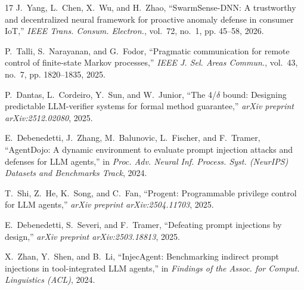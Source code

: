 \documentclass[conference]{IEEEtran}
\begin{document}
\begin{thebibliography}{17}
J.~Yang, L.~Chen, X.~Wu, and H.~Zhao, ``SwarmSense-DNN: A trustworthy and decentralized neural framework for proactive anomaly defense in consumer IoT,'' \emph{IEEE Trans. Consum. Electron.}, vol.~72, no.~1, pp. 45--58, 2026.

P.~Talli, S.~Narayanan, and G.~Fodor, ``Pragmatic communication for remote control of finite-state Markov processes,'' \emph{IEEE J. Sel. Areas Commun.}, vol.~43, no.~7, pp. 1820--1835, 2025.

P.~Dantas, L.~Cordeiro, Y.~Sun, and W.~Junior, ``The 4/$\delta$ bound: Designing predictable LLM-verifier systems for formal method guarantee,'' \emph{arXiv preprint arXiv:2512.02080}, 2025.

E.~Debenedetti, J.~Zhang, M.~Balunovic, L.~Fischer, and F.~Tramer, ``AgentDojo: A dynamic environment to evaluate prompt injection attacks and defenses for LLM agents,'' in \emph{Proc. Adv. Neural Inf. Process. Syst. (NeurIPS) Datasets and Benchmarks Track}, 2024.

T.~Shi, Z.~He, K.~Song, and C.~Fan, ``Progent: Programmable privilege control for LLM agents,'' \emph{arXiv preprint arXiv:2504.11703}, 2025.

E.~Debenedetti, S.~Severi, and F.~Tramer, ``Defeating prompt injections by design,'' \emph{arXiv preprint arXiv:2503.18813}, 2025.

X.~Zhan, Y.~Shen, and B.~Li, ``InjecAgent: Benchmarking indirect prompt injections in tool-integrated LLM agents,'' in \emph{Findings of the Assoc. for Comput. Linguistics (ACL)}, 2024.

\end{thebibliography}
\end{document}
